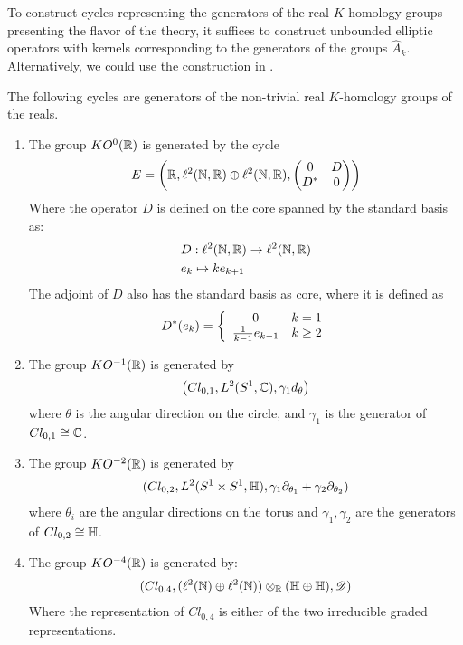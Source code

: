 To construct cycles representing the generators of the real $K$-homology groups presenting the flavor of the theory, it suffices to construct unbounded elliptic operators with kernels corresponding to the generators of the groups $\hat{A}_k$. Alternatively, we could use the construction in .
\begin{theorem}
	The following cycles are generators of the non-trivial real $K$-homology groups of the reals. 
	\begin{enumerate}
	\item
	The group $KO^0(\mathbb{R})$ is generated by the cycle 
	\begin{align*}
		E=\left ( \mathbb{R}, \ell^2(\mathbb{N},\mathbb{R})\oplus \ell^2(\mathbb{N},\mathbb{R}), \begin{pmatrix} 0 & D \\ D^* & 0\end{pmatrix} \right )
	\end{align*}
	Where the operator $D$ is defined on the core spanned by the standard basis as:
	\begin{align*}
		&D:\ell^2(\mathbb{N},\mathbb{R})\to \ell^2(\mathbb{N},\mathbb{R}) \\
		&e_k\mapsto ke_{k+1}
	\end{align*}
	The adjoint of $D$ also has the standard basis as core, where it is defined as 
	\begin{align*}
		D^*(e_k)=\left \{\begin{array}{c c} 0 & k=1 \\ \frac{1}{k-1}e_{k-1} &  k\geq 2 \end{array} \right .
	\end{align*}

	\item
		The group $KO^{-1}(\mathbb{R})$ is generated by 
		\begin{align*}
			\left ( Cl_{0,1}, L^2(S^1,\mathbb{C}), \gamma_1 d_\theta \right )
		\end{align*}
		where $\theta$ is the angular direction on the circle, and $\gamma_1$ is the generator of $Cl_{0,1}\cong \mathbb{C}$. 
	\item
		The group $KO^{-2}(\mathbb{R})$ is generated by 
		\begin{align*}
			(Cl_{0,2},L^2(S^1\times S^1,\mathbb{H}),\gamma_1 \partial_{\theta_1}+\gamma_2 \partial_{\theta_2})
		\end{align*}
		where $\theta_i$ are the angular directions on the torus and $\gamma_1,\gamma_2$ are the generators of $Cl_{0,2}\cong \mathbb{H}$.
	\item
		The group $KO^{-4}(\mathbb{R})$ is generated by:
			\begin{align*}
		(Cl_{0,4},(\ell^2(\mathbb{N})\oplus \ell^2(\mathbb{N}))\otimes_{\mathbb{R}} (\mathbb{H}\oplus \mathbb{H}),\mathscr{D})
	\end{align*}
		Where the representation of $Cl_{0,4}$ is either of the two irreducible graded representations. 


	\end{enumerate}
\end{theorem}

